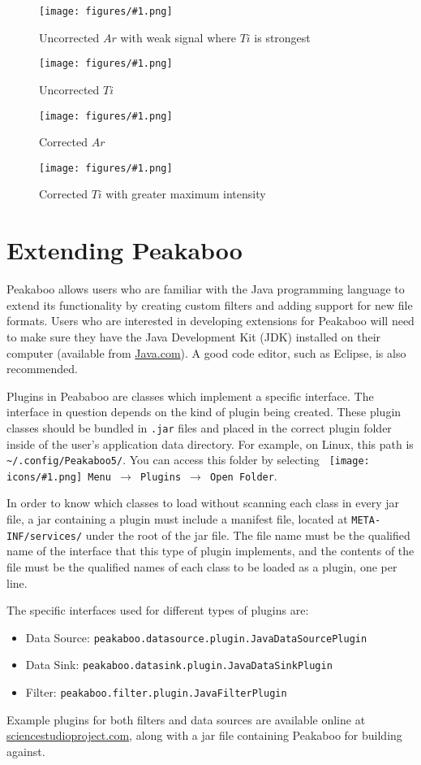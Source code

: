\documentclass[article,twoside,11pt]{report}
\newcommand{\command}[1]{\texttt{#1}}
\newcommand{\icon}[1]{\texttt{[image: icons/\#1.png]}}
\newcommand{\button}[2]{\ \command{\icon{#1} #2}}
\newcommand{\menu}[0]{$\rightarrow$}
\newcommand{\file}[1]{\command{#1}}
\newcommand{\code}[1]{\command{#1}}
\newcommand{\class}[1]{{\color{violet} \code{#1}}}
\newcommand{\element}[1]{$#1$}
\newcommand{\screenshot}[2]{%
\begin{figure}[h!]
\centering\texttt{[image: figures/\#1.png]}
\caption{#2}
\end{figure}
}
\newcommand{\tocchapter}[1]{\cleardoublepage\chapter*{#1}\addcontentsline{toc}{chapter}{#1}}
\begin{document}
\clearpage
\screenshot{normalize-uncorrected-ar}{Uncorrected \element{Ar} with weak signal where \element{Ti} is strongest}
\screenshot{normalize-uncorrected-ti}{Uncorrected \element{Ti}}
\screenshot{normalize-corrected-ar}{Corrected \element{Ar}}
\screenshot{normalize-corrected-ti}{Corrected \element{Ti} with greater maximum intensity}

\tocchapter{Extending Peakaboo}

Peakaboo allows users who are familiar with the Java programming language to extend its functionality by
creating custom filters and adding support for new file formats. Users who are interested in
developing extensions for Peakaboo will need to make sure they have the Java Development Kit (JDK)
installed on their computer (available from \href{http://java.com}{Java.com}). A good code editor,
such as Eclipse, is also recommended. 

Plugins in Peababoo are classes which implement a specific interface. The interface in question 
depends on the kind of plugin being created. These plugin classes should be bundled in \file{.jar} files
and placed in the correct plugin folder inside of the user's application data directory. For example, 
on Linux, this path is \file{\textasciitilde/.config/Peakaboo5/}. You can access this folder by selecting
\command{\button{action-menu}{Menu} \menu\ Plugins \menu\ Open Folder}.

In order to know which classes to load without scanning each class in every jar file, a jar 
containing a plugin must include a manifest file, located at \file{META-INF/services/} under
the root of the jar file. The file name must be the qualified name of the interface that this type
of plugin implements, and the contents of the file must be the qualified names of each class to be 
loaded as a plugin, one per line.

The specific interfaces used for different types of plugins are:
\begin{itemize}  
\item Data Source: \class{peakaboo.datasource.plugin.JavaDataSourcePlugin}
\item Data Sink: \class{peakaboo.datasink.plugin.JavaDataSinkPlugin}
\item Filter: \class{peakaboo.filter.plugin.JavaFilterPlugin}
\end{itemize}

Example plugins for both filters and data sources are available online at 
\href{http://sciencestudioproject.com/}{sciencestudioproject.com}, along with a jar file 
containing Peakaboo for building against.
\end{document}

